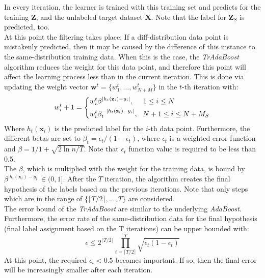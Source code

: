 In every iteration, the learner is trained with this training set and predicts for the training $\mathbf{Z}$, and the unlabeled target dataset $\mathbf{X}$.
Note that the label for $\mathbf{Z}_S$ is predicted, too.\cite{Dai.}\\
At this point the filtering takes place:
If a diff-distribution data point is mistakenly predicted, then it may be caused by the difference of this instance to the same-distribution training data.
When this is the case, the \textit{TrAdaBoost} algorithm reduces the weight for this data point, and therefore this point will affect the learning process less than in the current iteration.
This is done via updating the weight vector $\mathbf{w}^t=\{w_1^t,\dots,w_{N+M}^t\}$ in the $t$-th iteration with:\cite{Dai.}
\begin{equation}\label{EqTrAdaWeighting}
	w_i^t+1=\begin{dcases}
				w_i^t\beta^{\vert h_t(\mathbf{z}_i )-y_i\vert}, \>\>\>\>\>\> 1\le i \le N \\
				w_i^t\beta_t^{-\vert h_t(\mathbf{z}_i )-y_i\vert}, \>\>\> N+1\le i \le N+M_S
			 \end{dcases}
\end{equation}
Where $ h_t(\mathbf{x}_i )$ is the predicted label for the $i$-th data point.
Furthermore, the different betas are set to $\beta_t = \epsilon_t / (1-\epsilon_t)$, where $\epsilon_t$ is a weighted error function and $\beta= 1 / 1 + \sqrt{2\ln n/T}$.
Note that $\epsilon_t$ function value is required to be less than 0.5.\\
The $\beta$, which is multiplied with the weight for the training data, is bound by $\beta^{\vert h_t(\mathbf{x}_i )-y_i\vert} \in (0,1]$.
After the $T$ iteration, the algorithm creates the final hypothesis of the labels based on the previous iterations.
Note that only steps which are in the range of $\{\lceil T /2 \rceil,\dots,T\}$ are considered.\cite{Dai.}\\
The error bound of the \textit{TrAdaBoost} are similar to the underlying \textit{AdaBoost}.
Furthermore, the error rate of the same-distribution data for the final hypothesis (final label assignment based on the T iterations) can be upper bounded with:
\begin{equation}
	\epsilon \le 2^{\lceil T / 2\rceil} \prod_{t=\lceil T / 2\rceil}^{T} \sqrt{\epsilon_t(1-\epsilon_t)}
\end{equation}
At this point, the required $\epsilon_t < 0.5$ becomes important.
If so, then the final error will be increasingly smaller after each iteration.\cite{Dai.}


